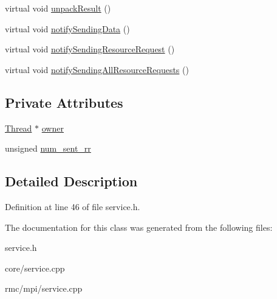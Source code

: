 \begin{CompactItemize}
\item 
\hypertarget{classService_45c06344edbfa482b91f68e2035a6099}{
virtual void \hyperlink{classService_45c06344edbfa482b91f68e2035a6099}{unpack\-Result} ()}
\label{classService_45c06344edbfa482b91f68e2035a6099}

\item 
\hypertarget{classService_81ad4d6ebb50045b8977e2ab74826f30}{
virtual void \hyperlink{classService_81ad4d6ebb50045b8977e2ab74826f30}{notify\-Sending\-Data} ()}
\label{classService_81ad4d6ebb50045b8977e2ab74826f30}

\item 
\hypertarget{classService_94e2012e76aaae3aa8199250f558d503}{
virtual void \hyperlink{classService_94e2012e76aaae3aa8199250f558d503}{notify\-Sending\-Resource\-Request} ()}
\label{classService_94e2012e76aaae3aa8199250f558d503}

\item 
\hypertarget{classService_f94cc8a5c2665d4574041737e61e9ffc}{
virtual void \hyperlink{classService_f94cc8a5c2665d4574041737e61e9ffc}{notify\-Sending\-All\-Resource\-Requests} ()}
\label{classService_f94cc8a5c2665d4574041737e61e9ffc}

\end{CompactItemize}
\subsection*{Private Attributes}
\begin{CompactItemize}
\item 
\hypertarget{classService_8b615c65c876f342fe8209eb7e36d7b2}{
\hyperlink{classThread}{Thread} $\ast$ \hyperlink{classService_8b615c65c876f342fe8209eb7e36d7b2}{owner}}
\label{classService_8b615c65c876f342fe8209eb7e36d7b2}

\item 
\hypertarget{classService_a5b2ad9520bb3710b54348b99acebd58}{
unsigned \hyperlink{classService_a5b2ad9520bb3710b54348b99acebd58}{num\_\-sent\_\-rr}}
\label{classService_a5b2ad9520bb3710b54348b99acebd58}

\end{CompactItemize}


\subsection{Detailed Description}




Definition at line 46 of file service.h.

The documentation for this class was generated from the following files:\begin{CompactItemize}
\item 
service.h\item 
core/service.cpp\item 
rmc/mpi/service.cpp\end{CompactItemize}
